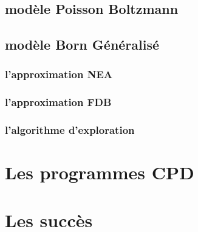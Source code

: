 \subsection{modèle Poisson Boltzmann}
\subsection{modèle Born Généralisé}
\subsubsection{l'approximation NEA}
\subsubsection{l'approximation FDB}
\subsubsection{l'algorithme d'exploration}

\section{Les programmes CPD}
\section{Les succès}

